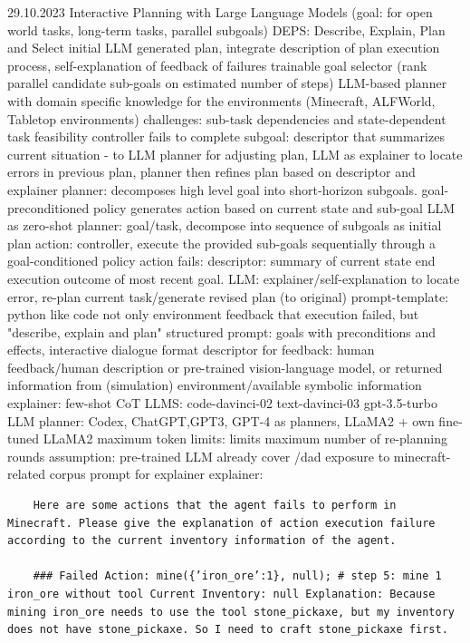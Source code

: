 \documentclass{article}
\begin{document}
\cite{wang_describe_2023} 29.10.2023
Interactive Planning with Large Language Models (goal: for open world tasks, long-term tasks, parallel subgoals)
DEPS: Describe, Explain, Plan and Select
initial LLM generated plan, integrate description of plan execution process, self-explanation of feedback of failures
trainable goal selector (rank parallel candidate sub-goals on estimated number of steps)
LLM-based planner with domain specific knowledge for the environments (Minecraft, ALFWorld, Tabletop environments)
challenges: sub-task dependencies and state-dependent task feasibility
controller fails to complete subgoal: descriptor that summarizes current situation - to LLM planner for adjusting plan, LLM as explainer to locate errors in previous plan, planner then refines plan based on descriptor and explainer
planner: decomposes high level goal into short-horizon subgoals. goal-preconditioned policy generates action based on current state and sub-goal
LLM as zero-shot planner: goal/task, decompose into sequence of subgoals as initial plan
action: controller, execute the provided sub-goals sequentially through a goal-conditioned policy
action fails: descriptor: summary of current state end execution outcome of most recent goal. LLM: explainer/self-explanation to locate error, re-plan current task/generate revised plan (to original)
prompt-template: python like code
not only environment feedback that execution failed, but "describe, explain and plan"
structured prompt: goals with preconditions and effects, interactive dialogue format
descriptor for feedback: human feedback/human description or pre-trained vision-language model, or returned information from (simulation) environment/available symbolic information
explainer: few-shot CoT
LLMS: code-davinci-02 text-davinci-03 gpt-3.5-turbo
LLM planner: Codex, ChatGPT,GPT3, GPT-4 as planners, LLaMA2 + own fine-tuned LLaMA2
maximum token limits: limits maximum number of re-planning rounds
assumption: pre-trained LLM already cover /dad exposure to minecraft-related corpus
prompt for explainer explainer:
\begin{verbatim}
	Here are some actions that the agent fails to perform in Minecraft. Please give the explanation of action execution failure according to the current inventory information of the agent. 
	
	### Failed Action: mine({’iron_ore’:1}, null); # step 5: mine 1 iron_ore without tool Current Inventory: null Explanation: Because mining iron_ore needs to use the tool stone_pickaxe, but my inventory does not have stone_pickaxe. So I need to craft stone_pickaxe first.
\end{verbatim}
\end{document}
